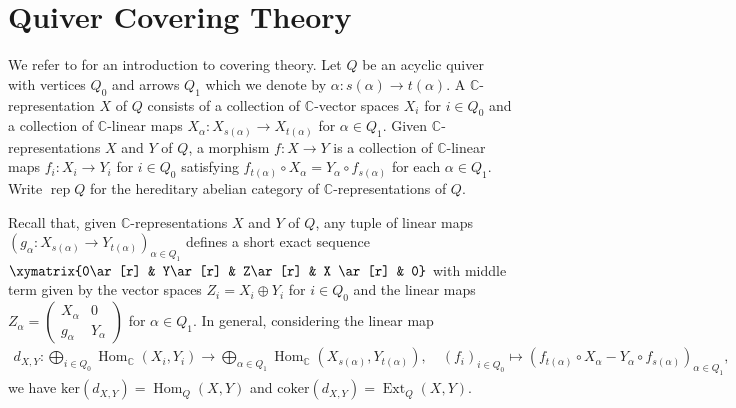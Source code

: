 \documentclass{amsart}
\numberwithin{equation}{section}
\newcommand{\C}{\mathbb{C}}
\newcommand{\rep}{\operatorname{rep}}
\newcommand{\CC}{\mathbb{C}}
\newcommand{\Ext}{\operatorname{Ext}}
\newcommand{\Hom}{\operatorname{Hom}}
\newcommand{\ses}[3]{\xymatrix{0\ar[r] & #1\ar[r] & #2\ar[r] & #3 \ar[r] & 0}}
\begin{document}
\section{Quiver Covering Theory}
\label{sec:covering}
\noindent
We refer to \cite{gab} for an introduction to covering theory.
Let $Q$ be an acyclic quiver with vertices $Q_0$ and arrows $Q_1$ which we denote by $\alpha:s(\alpha)\to t(\alpha)$.
A $\CC$-representation $X$ of $Q$ consists of a collection of $\CC$-vector spaces $X_i$ for $i\in Q_0$ and a collection of $\CC$-linear maps $X_\alpha:X_{s(\alpha)}\to X_{t(\alpha)}$ for $\alpha\in Q_1$.
Given $\CC$-representations $X$ and $Y$ of $Q$, a morphism $f:X\to Y$ is a collection of $\CC$-linear maps $f_i:X_i\to Y_i$ for $i\in Q_0$ satisfying $f_{t(\alpha)}\circ X_\alpha=Y_\alpha\circ f_{s(\alpha)}$ for each $\alpha\in Q_1$.
Write $\rep Q$ for the hereditary abelian category of $\C$-representations of $Q$.

Recall that, given $\CC$-representations $X$ and $Y$ of $Q$, any tuple of linear maps $(g_\alpha:X_{s(\alpha)}\to Y_{t(\alpha)})_{\alpha\in Q_1}$ defines a short exact sequence $\ses{Y}{Z}{X}$ with middle term given by the vector spaces $Z_i=X_i\oplus Y_i$ for $i\in Q_0$ and the linear maps $Z_\alpha=\begin{pmatrix} X_\alpha & 0 \\ g_\alpha & Y_\alpha \end{pmatrix}$ for $\alpha\in Q_1$. 
In general, considering the linear map  
\begin{align}
  \label{eq:maphomext}
  d_{X,Y}:\bigoplus_{i\in Q_0}\Hom_\CC(X_i,Y_i)\to\bigoplus_{\alpha\in Q_1}\Hom_\CC(X_{s(\alpha)},Y_{t(\alpha)}),
  \quad (f_i)_{i\in Q_0}\mapsto(f_{t(\alpha)}\circ X_\alpha-Y_\alpha\circ f_{s(\alpha)})_{\alpha\in Q_1},
\end{align}
we have $\mathrm{ker}(d_{X,Y})=\Hom_Q(X,Y)$ and $\mathrm{coker}(d_{X,Y})=\Ext_Q(X,Y)$.
\end{document}
